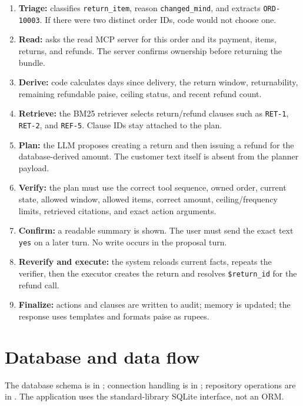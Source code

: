 \documentclass[11pt,a4paper]{article}
\begin{document}
\begin{enumerate}
\item \textbf{Triage:} classifies \texttt{return\_item}, reason \texttt{changed\_mind}, and extracts \texttt{ORD-10003}. If there were two distinct order IDs, code would not choose one.
\item \textbf{Read:}  asks the read MCP server for this order and its payment, items, returns, and refunds. The server confirms ownership before returning the bundle.
\item \textbf{Derive:} code calculates days since delivery, the return window, returnability, remaining refundable paise, ceiling status, and recent refund count.
\item \textbf{Retrieve:} the BM25 retriever selects return/refund clauses such as \texttt{RET-1}, \texttt{RET-2}, and \texttt{REF-5}. Clause IDs stay attached to the plan.
\item \textbf{Plan:} the LLM proposes creating a return and then issuing a refund for the database-derived amount. The customer text itself is absent from the planner payload.
\item \textbf{Verify:} the plan must use the correct tool sequence, owned order, current state, allowed window, allowed items, correct amount, ceiling/frequency limits, retrieved citations, and exact action arguments.
\item \textbf{Confirm:} a readable summary is shown. The user must send the exact text \texttt{yes} on a later turn. No write occurs in the proposal turn.
\item \textbf{Reverify and execute:} the system reloads current facts, repeats the verifier, then the executor creates the return and resolves \texttt{\$return\_id} for the refund call.
\item \textbf{Finalize:} actions and clauses are written to audit; memory is updated; the response uses templates and formats paise as rupees.
\end{enumerate}

\section{Database and data flow}

The database schema is in ; connection handling is in ; repository operations are in . The application uses the standard-library SQLite interface, not an ORM.
\end{document}
